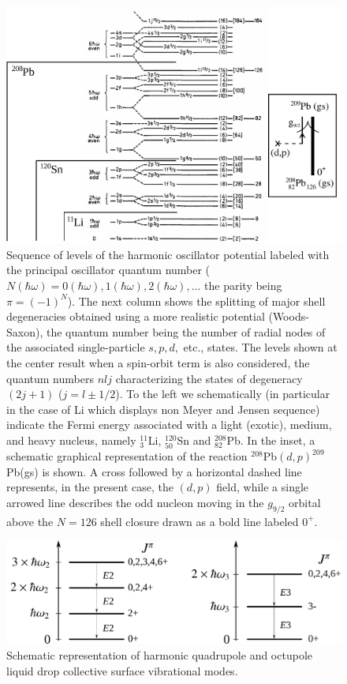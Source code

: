 \begin{figure}
	\centerline {
		\includegraphics*[width=12cm]{introduccion/figs/figpreface3}
	}
	\caption{Sequence of levels of the harmonic oscillator potential labeled with the principal oscillator quantum number ($N(\hbar\omega)=0(\hbar\omega),1 (\hbar\omega), 2(\hbar\omega),\dots$ the parity being $\pi=(-1)^N$). The next column shows the splitting of major shell degeneracies obtained using a more realistic potential (Woods-Saxon), the quantum number being the number of radial nodes of the associated single-particle $s,p,d,$ etc., states. The levels shown at the center result when a spin-orbit term is also considered, the quantum numbers $nlj$ characterizing the states of degeneracy $(2j+1)$ ($j=l\pm1/2$). To the left we schematically (in particular in the case of Li which displays non Meyer and Jensen sequence) indicate the Fermi energy associated with a light (exotic), medium, and heavy nucleus, namely $^{11}_3$Li, $^{120}_{50}$Sn and $^{208}_{82}$Pb. In the inset, a schematic graphical representation of the reaction $^{208}$Pb$(d,p)^{209}$Pb(gs) is shown. A cross followed by a horizontal dashed line represents, in the present case,  the $(d,p)$ field, while a  single arrowed line describes the odd nucleon moving in the $g_{9/2}$ orbital above the $N=126$ shell closure drawn as a bold line labeled $0^+$.}
	\label{fig1.0.3}
\end{figure}
\begin{figure}
	\centerline {
		\includegraphics*[width=12cm]{introduccion/figs/fig1_1_4}
	}
	\caption{Schematic representation of harmonic quadrupole and octupole liquid drop collective surface vibrational modes.}
	\label{fig1.0.4}
\end{figure}

